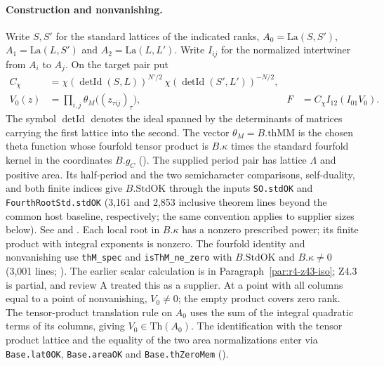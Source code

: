 \paragraph{Construction and nonvanishing.}\label{r14:vec-transport}
Write \(S,S'\) for the standard lattices of the indicated ranks,
\(A_0=\mathrm{La}(S,S')\), \(A_1=\mathrm{La}(L,S')\) and
\(A_2=\mathrm{La}(L,L')\). Write \(I_{ij}\) for the normalized
intertwiner from \(A_i\) to \(A_j\). On the target pair put
\[
 \begin{aligned}
  C_\chi&=\chi(\operatorname{detId}(S,L))^{N'/2}\,
           \chi(\operatorname{detId}(S',L'))^{-N/2},\\
  V_0(z)&=\prod_{i,j}\theta_M\big((z_{\tau i j})_\tau\big),
     & F&=C_\chi I_{12}(I_{01}V_0).
 \end{aligned}
\]
The symbol \(\operatorname{detId}\) denotes the ideal spanned by the determinants
of matrices carrying the first lattice into the second. The vector
\(\theta_M=B.\mathrm{thMM}\) is the chosen theta function whose
fourfold tensor product is \(B.\kappa\) times the standard fourfold
kernel in the coordinates \(B.g_C\)
().
The supplied period pair has lattice \(\Lambda\) and positive area.
Its half-period and the two semicharacter comparisons, self-duality,
and both finite indices give \(B.\mathrm{StdOK}\)
through the inputs \nolinkurl{SO.stdOK} and \nolinkurl{FourthRootStd.stdOK}
(3,161 and 2,853 inclusive theorem lines beyond the common host baseline,
respectively; the same convention applies to supplier sizes below).
See  and .
Each local root in \(B.\kappa\) has a nonzero prescribed power; its
finite product with integral exponents is nonzero. The fourfold identity and nonvanishing
use \nolinkurl{thM_spec} and \nolinkurl{isThM_ne_zero} with $B.\mathrm{StdOK}$
and $B.\kappa\ne0$ (3,001 lines;
).
The earlier scalar calculation is in Paragraph~\ref{par:r4-z43-iso};
Z4.3 is partial, and review A treated this as a supplier. At a point with all columns
equal to a point of nonvanishing, \(V_0\ne0\); the empty product
covers zero rank. The tensor-product translation rule on \(A_0\)
uses the sum of the integral quadratic terms of its columns, giving
\(V_0\in\mathrm{Th}(A_0)\).
The identification with the tensor product lattice and the equality of
the two area normalizations enter via \nolinkurl{Base.lat0OK},
\nolinkurl{Base.areaOK} and \nolinkurl{Base.thZeroMem}
().

